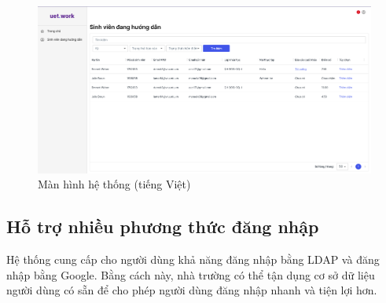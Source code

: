 \documentclass[./../main.tex]{subfiles}
\begin{document}
\begin{figure}[]
	\includegraphics[width=\linewidth]{./images/image12.png}
	\caption{Màn hình hệ thống (tiếng Việt)}
	\label{fig:vi_page}
\end{figure}

\hypertarget{hux1ed7-trux1ee3-nhiux1ec1u-phux1b0ux1a1ng-thux1ee9c-ux111ux103ng-nhux1eadp}{%
\subsection{Hỗ trợ nhiều phương thức đăng
nhập}\label{hux1ed7-trux1ee3-nhiux1ec1u-phux1b0ux1a1ng-thux1ee9c-ux111ux103ng-nhux1eadp}}

Hệ thống cung cấp cho người dùng khả năng đăng nhập bằng LDAP và đăng
nhập bằng Google. Bằng cách này, nhà trường có thể tận dụng cơ sở dữ
liệu người dùng có sẵn để cho phép người dùng đăng nhập nhanh và tiện
lợi hơn.
\end{document}
